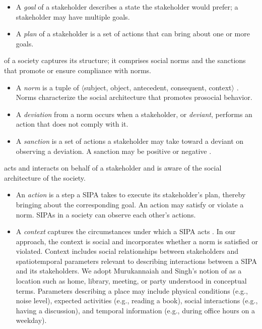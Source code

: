 \begin{itemize}[nosep]
  \item A \emph{goal} of a stakeholder describes a state the stakeholder would prefer; a stakeholder may have multiple goals.
  \item A \emph{plan} of a stakeholder is a set of actions that can bring about one or more goals.
\end{itemize}

 of a society captures its structure; it comprises social norms and the sanctions that promote or ensure compliance with norms.

\begin{itemize}[nosep]
  \item A \emph{norm} is a tuple of $\langle$subject, object, antecedent, consequent, context$\rangle$ \citep{Singh-2013-Norms}. 
    Norms characterize the social architecture that promotes prosocial behavior. 
  \item A \emph{deviation} from a norm occurs when a stakeholder, or \emph{deviant}, performs an action that does not comply with it.
  \item A \emph{sanction} is a set of actions a stakeholder may take toward a deviant on observing a deviation. A sanction may be positive or negative \citep{Nardin-KER16-Classifying}.
\end{itemize}

 acts and interacts on behalf of a stakeholder and
is aware of the social architecture of the society.

\begin{itemize}[nosep]
  \item An \emph{action} is a step a SIPA takes to execute its
    stakeholder's plan, thereby bringing about the corresponding goal.
    An action may satisfy or violate a norm. SIPAs in a society can
    observe each other's actions. 

  \item A \emph{context} captures the circumstances under which a SIPA acts \citep{Dey-2001-Context}. In our approach, the context is social and incorporates whether a norm is satisfied or violated. 
     Context includes social relationships between stakeholders and spatiotemporal parameters relevant to describing interactions between a SIPA and its stakeholders. We adopt Murukannaiah and Singh's  notion of  as a location such as home, library, meeting, or party understood in conceptual terms. Parameters describing a place may include physical conditions (e.g., noise level), expected activities (e.g., reading a book), social interactions (e.g., having a discussion), and temporal information (e.g., during office hours on a weekday). 

\end{itemize}

